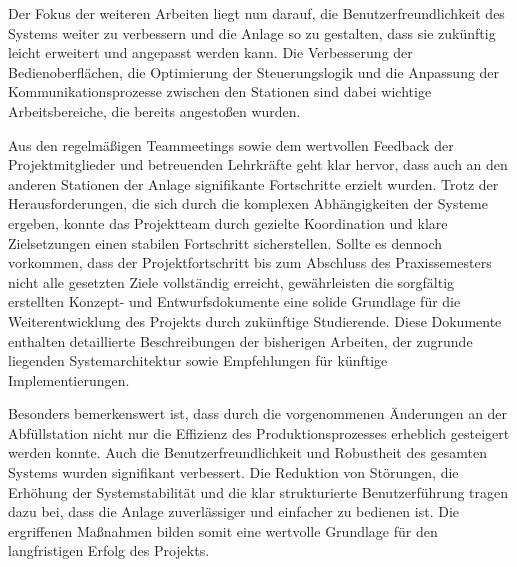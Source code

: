 Der Fokus der weiteren Arbeiten liegt nun darauf, die Benutzerfreundlichkeit des Systems weiter zu verbessern und die Anlage so zu gestalten, 
dass sie zukünftig leicht erweitert und angepasst werden kann. Die Verbesserung der Bedienoberflächen, die Optimierung der Steuerungslogik und 
die Anpassung der Kommunikationsprozesse zwischen den Stationen sind dabei wichtige Arbeitsbereiche, die bereits angestoßen wurden.

Aus den regelmäßigen Teammeetings sowie dem wertvollen Feedback der Projektmitglieder und betreuenden Lehrkräfte geht klar hervor, dass auch an 
den anderen Stationen der Anlage signifikante Fortschritte erzielt wurden. Trotz der Herausforderungen, die sich durch die komplexen 
Abhängigkeiten der Systeme ergeben, konnte das Projektteam durch gezielte Koordination und klare Zielsetzungen einen stabilen Fortschritt 
sicherstellen. Sollte es dennoch vorkommen, dass der Projektfortschritt bis zum Abschluss des Praxissemesters nicht alle gesetzten Ziele 
vollständig erreicht, gewährleisten die sorgfältig erstellten Konzept- und Entwurfsdokumente eine solide Grundlage für die Weiterentwicklung 
des Projekts durch zukünftige Studierende. Diese Dokumente enthalten detaillierte Beschreibungen der bisherigen Arbeiten, der zugrunde liegenden 
Systemarchitektur sowie Empfehlungen für künftige Implementierungen.

Besonders bemerkenswert ist, dass durch die vorgenommenen Änderungen an der Abfüllstation nicht nur die Effizienz des Produktionsprozesses 
erheblich gesteigert werden konnte. Auch die Benutzerfreundlichkeit und Robustheit des gesamten Systems wurden signifikant verbessert. 
Die Reduktion von Störungen, die Erhöhung der Systemstabilität und die klar strukturierte Benutzerführung tragen dazu bei, dass die Anlage 
zuverlässiger und einfacher zu bedienen ist. Die ergriffenen Maßnahmen bilden somit eine wertvolle Grundlage für den langfristigen Erfolg 
des Projekts.
